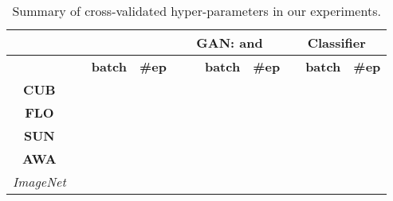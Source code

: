 \documentclass[runningheads]{llncs}
\begin{document}
\begin{table}[t]
\centering
\caption{Summary of cross-validated hyper-parameters in our experiments.}
\label{tab:hyp}
\begin{tabular}{|lcccccccccc|}
\hline
    &  \multicolumn{3}{|c|}{} & \multicolumn{4}{|c|}{GAN:  and } & \multicolumn{3}{|c|}{Classifier} \\
    \hline
    & \multicolumn{1}{|c|}{}& \multicolumn{1}{|c|}{\textbf{batch}}    & \multicolumn{1}{|c|}{\textbf{\#ep}}
    & \multicolumn{1}{|c|}{\textbf{}}  & \multicolumn{1}{|c|}{\textbf{}} & \multicolumn{1}{|c|}{\textbf{batch}} & \multicolumn{1}{|c|}{\textbf{\#ep}} 
    & \multicolumn{1}{|c|}{\textbf{}}   & \multicolumn{1}{|c|}{\textbf{batch}}  & \multicolumn{1}{|c|}{\textbf{\#ep}} 
    \\ \hline
\multicolumn{1}{|c|}{\textbf{CUB}} & \multicolumn{1}{|c|}{} & \multicolumn{1}{|c|}{} & \multicolumn{1}{|c|}{} & \multicolumn{1}{|c|}{} & \multicolumn{1}{|c|}{} & \multicolumn{1}{|c|}{} & \multicolumn{1}{|c|}{} & \multicolumn{1}{|c|}{} & \multicolumn{1}{|c|}{} & \multicolumn{1}{|c|}{} \\
\multicolumn{1}{|c|}{\textbf{FLO}} & \multicolumn{1}{|c|}{} & \multicolumn{1}{|c|}{} & \multicolumn{1}{|c|}{} & \multicolumn{1}{|c|}{} & \multicolumn{1}{|c|}{} & \multicolumn{1}{|c|}{} & \multicolumn{1}{|c|}{} & \multicolumn{1}{|c|}{} & \multicolumn{1}{|c|}{} & \multicolumn{1}{|c|}{} \\
\multicolumn{1}{|c|}{\textbf{SUN}} & \multicolumn{1}{|c|}{} & \multicolumn{1}{|c|}{} & \multicolumn{1}{|c|}{} & \multicolumn{1}{|c|}{} & \multicolumn{1}{|c|}{} & \multicolumn{1}{|c|}{} & \multicolumn{1}{|c|}{} & \multicolumn{1}{|c|}{} & \multicolumn{1}{|c|}{} & \multicolumn{1}{|c|}{} \\
\multicolumn{1}{|c|}{\textbf{AWA}} & \multicolumn{1}{|c|}{} & \multicolumn{1}{|c|}{} & \multicolumn{1}{|c|}{} & \multicolumn{1}{|c|}{} & \multicolumn{1}{|c|}{} & \multicolumn{1}{|c|}{} & \multicolumn{1}{|c|}{} & \multicolumn{1}{|c|}{} & \multicolumn{1}{|c|}{} & \multicolumn{1}{|c|}{} \\

\multicolumn{1}{|c|}{\textit{ImageNet}} & \multicolumn{1}{|c|}{} & \multicolumn{1}{|c|}{} & \multicolumn{1}{|c|}{} & \multicolumn{1}{|c|}{} & \multicolumn{1}{|c|}{} & \multicolumn{1}{|c|}{} & \multicolumn{1}{|c|}{} & \multicolumn{1}{|c|}{} & \multicolumn{1}{|c|}{} & \multicolumn{1}{|c|}{} 


\\ \hline
\end{tabular}
\end{table}
\end{document}
